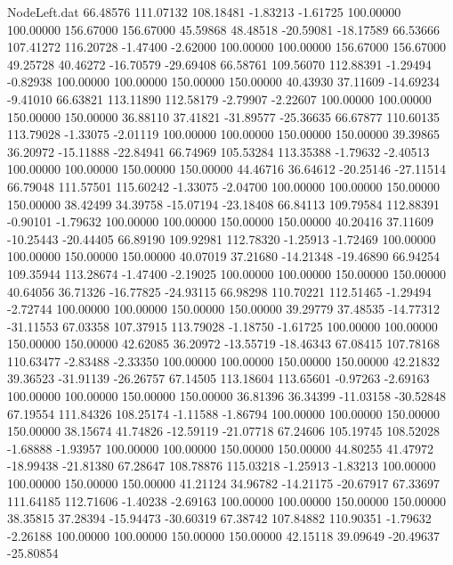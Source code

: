 \begin{filecontents}{NodeLeft.dat}
  66.48576  111.07132  108.18481    -1.83213   -1.61725  100.00000  100.00000  156.67000  156.67000   45.59868   48.48518  -20.59081  -18.17589
  66.53666  107.41272  116.20728    -1.47400   -2.62000  100.00000  100.00000  156.67000  156.67000   49.25728   40.46272  -16.70579  -29.69408
  66.58761  109.56070  112.88391    -1.29494   -0.82938  100.00000  100.00000  150.00000  150.00000   40.43930   37.11609  -14.69234   -9.41010
  66.63821  113.11890  112.58179    -2.79907   -2.22607  100.00000  100.00000  150.00000  150.00000   36.88110   37.41821  -31.89577  -25.36635
  66.67877  110.60135  113.79028    -1.33075   -2.01119  100.00000  100.00000  150.00000  150.00000   39.39865   36.20972  -15.11888  -22.84941
  66.74969  105.53284  113.35388    -1.79632   -2.40513  100.00000  100.00000  150.00000  150.00000   44.46716   36.64612  -20.25146  -27.11514
  66.79048  111.57501  115.60242    -1.33075   -2.04700  100.00000  100.00000  150.00000  150.00000   38.42499   34.39758  -15.07194  -23.18408
  66.84113  109.79584  112.88391    -0.90101   -1.79632  100.00000  100.00000  150.00000  150.00000   40.20416   37.11609  -10.25443  -20.44405
  66.89190  109.92981  112.78320    -1.25913   -1.72469  100.00000  100.00000  150.00000  150.00000   40.07019   37.21680  -14.21348  -19.46890
  66.94254  109.35944  113.28674    -1.47400   -2.19025  100.00000  100.00000  150.00000  150.00000   40.64056   36.71326  -16.77825  -24.93115
  66.98298  110.70221  112.51465    -1.29494   -2.72744  100.00000  100.00000  150.00000  150.00000   39.29779   37.48535  -14.77312  -31.11553
  67.03358  107.37915  113.79028    -1.18750   -1.61725  100.00000  100.00000  150.00000  150.00000   42.62085   36.20972  -13.55719  -18.46343
  67.08415  107.78168  110.63477    -2.83488   -2.33350  100.00000  100.00000  150.00000  150.00000   42.21832   39.36523  -31.91139  -26.26757
  67.14505  113.18604  113.65601    -0.97263   -2.69163  100.00000  100.00000  150.00000  150.00000   36.81396   36.34399  -11.03158  -30.52848
  67.19554  111.84326  108.25174    -1.11588   -1.86794  100.00000  100.00000  150.00000  150.00000   38.15674   41.74826  -12.59119  -21.07718
  67.24606  105.19745  108.52028    -1.68888   -1.93957  100.00000  100.00000  150.00000  150.00000   44.80255   41.47972  -18.99438  -21.81380
  67.28647  108.78876  115.03218    -1.25913   -1.83213  100.00000  100.00000  150.00000  150.00000   41.21124   34.96782  -14.21175  -20.67917
  67.33697  111.64185  112.71606    -1.40238   -2.69163  100.00000  100.00000  150.00000  150.00000   38.35815   37.28394  -15.94473  -30.60319
  67.38742  107.84882  110.90351    -1.79632   -2.26188  100.00000  100.00000  150.00000  150.00000   42.15118   39.09649  -20.49637  -25.80854

\end{filecontents}
